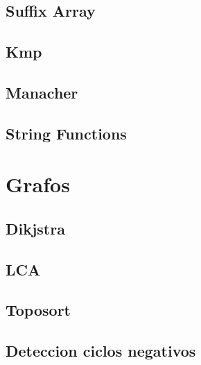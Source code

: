 \documentclass[a4paper,11pt,landscape,twocolumn]{article}
\begin{document}


\subsection{Suffix Array}



\subsection{Kmp}



\subsection{Manacher}



\subsection{String Functions}



\section{Grafos}

\subsection{Dikjstra}



\subsection{LCA}



\subsection{Toposort}



\subsection{Deteccion ciclos negativos}
\end{document}
